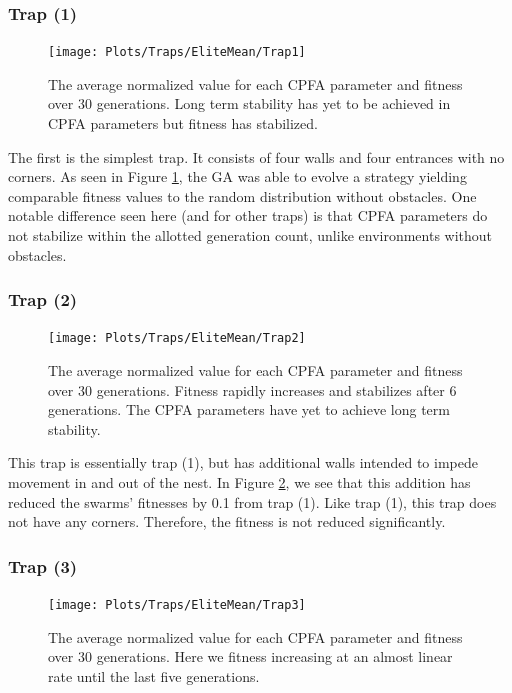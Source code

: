 \documentclass{acm_proc_article-sp}
\begin{document}
\subsubsection{Trap (1)}

\begin{figure}[h]
\texttt{[image: Plots/Traps/EliteMean/Trap1]}
\caption{The average normalized value for each CPFA parameter and fitness over 30 generations. Long term stability has yet to be achieved in CPFA parameters but fitness has stabilized.} \label{fig:Trap1}
\end{figure}

The first is the simplest trap. It consists of four walls and four entrances with no corners. As seen in Figure \ref{fig:Trap1}, the GA was able to evolve a strategy yielding comparable fitness values to the random distribution without obstacles. One notable difference seen here (and for other traps) is that CPFA parameters do not stabilize within the allotted generation count, unlike environments without obstacles.

\subsubsection{Trap (2)}

\begin{figure}[h]
\texttt{[image: Plots/Traps/EliteMean/Trap2]}
\caption{The average normalized value for each CPFA parameter and fitness over 30 generations. Fitness rapidly increases and stabilizes after 6 generations. The CPFA parameters have yet to achieve long term stability.} \label{fig:Trap2}
\end{figure}

This trap is essentially trap (1), but has additional walls intended to impede movement in and out of the nest. In Figure \ref{fig:Trap2}, we see that this addition has reduced the swarms' fitnesses by 0.1 from trap (1). Like trap (1), this trap does not have any corners. Therefore, the fitness is not reduced significantly. 

\subsubsection{Trap (3)}

\begin{figure}[h]
\texttt{[image: Plots/Traps/EliteMean/Trap3]}
\caption{The average normalized value for each CPFA parameter and fitness over 30 generations. Here we fitness increasing at an almost linear rate until the last five generations.} \label{fig:Trap3}
\end{figure}
\end{document}
